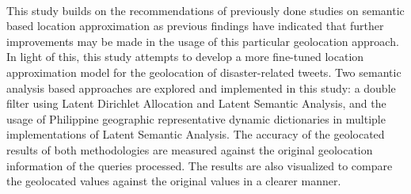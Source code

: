 \begin{thesisabstract}
    \paragraph{         }
    This study builds on the recommendations of previously done studies on semantic based location approximation as previous findings have indicated that further improvements may be made in the usage of this particular geolocation approach. In light of this, this study attempts to develop a more fine-tuned location approximation model for the geolocation of disaster-related tweets. Two semantic analysis based approaches are explored and implemented in this study: a double filter using Latent Dirichlet Allocation and Latent Semantic Analysis, and the usage of Philippine geographic representative dynamic dictionaries in multiple implementations of Latent Semantic Analysis. The accuracy of the geolocated results of both methodologies are measured against the original geolocation information of the queries processed. The results are also visualized to compare the geolocated values against the original values in a clearer manner.
\end{thesisabstract}